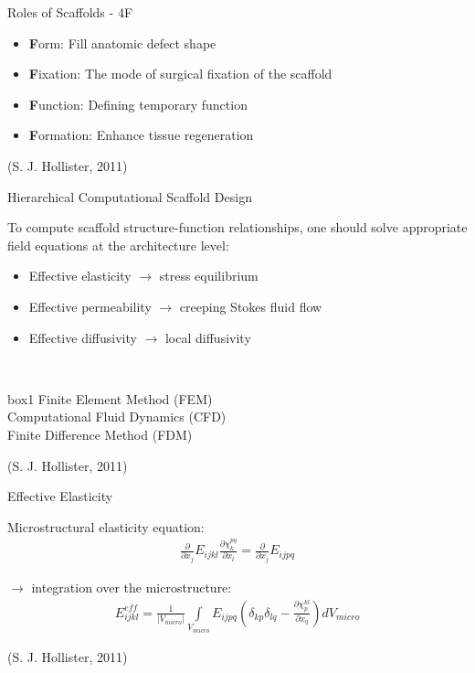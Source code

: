 \documentclass[11pt,t]{beamer}
\newcommand{\Int}{\int\limits}
\begin{document}
\begin{frame}[fragile]{Roles of Scaffolds - 4F}  

\begin{itemize}
\item
\textbf{F}orm:  Fill anatomic defect shape 
\item
\textbf{F}ixation: The mode of surgical fixation of the scaffold 
\item
\textbf{F}unction: Defining temporary function
\item
\textbf{F}ormation: Enhance tissue regeneration
\end{itemize}

\vfill
\footnotesize(S. J. Hollister, 2011)
		
\end{frame}


\begin{frame}[fragile]{Hierarchical Computational Scaffold Design}

 To compute scaffold structure-function relationships, 
 one should solve appropriate field equations at the architecture level:
 
 \begin{itemize}
 \item
 Effective elasticity $\rightarrow$ stress equilibrium
 \item
 Effective permeability $\rightarrow$ creeping Stokes fluid flow
 \item
 Effective diffusivity $\rightarrow$ local diffusivity
 \end{itemize}

	\begin{center}~
		\begin{beamercolorbox}[wd=.7\textwidth,sep=4pt,center]{box1}
		Finite Element Method (FEM)\\
		Computational Fluid Dynamics (CFD)\\
		Finite Difference Method (FDM)
		\end{beamercolorbox}
	\end{center}


\footnotesize(S. J. Hollister, 2011)
		
\end{frame}


\begin{frame}[fragile]{Effective Elasticity}
	
	Microstructural elasticity equation:
	\begin{gather*}
	\frac{\partial}{\partial x_j}E_{ijkl}\frac{\partial \chi^{pq}_k}{\partial x_l} = \frac{\partial}{\partial x_j}E_{ijpq}
	\end{gather*}
	
	$\rightarrow$ integration over the microstructure:
	\begin{gather*}
	E^{eff}_{ijkl} = \frac{1}{|V_{micro}|}\Int_{V_{micro}} E_{ijpq} \left( \delta_{kp}\delta_{lq}   - \frac{\partial \chi^{kl}_p}{\partial x_q} \right) dV_{micro}
	\end{gather*}

\vfill
\footnotesize(S. J. Hollister, 2011)
		
\end{frame}
\end{document}
